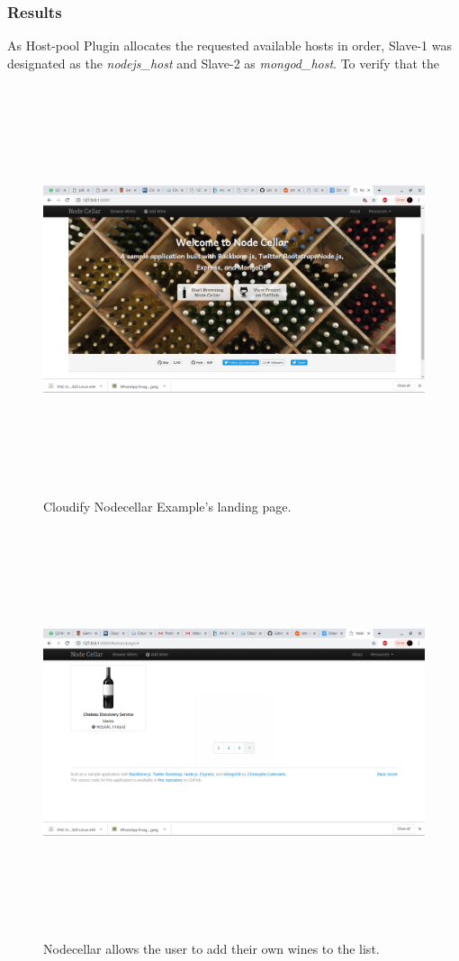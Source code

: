 \subsubsection*{Results}

As Host-pool Plugin allocates the requested available hosts in order, Slave-1 was designated as the \textit{nodejs\_host} and Slave-2 as \textit{mongod\_host}. To verify that the 

 \begin{figure}[ht!]
\centering
  \includegraphics[width=12cm,height=12cm, keepaspectratio]{Nodecellarscreenshot.png}%
  \caption{Cloudify Nodecellar Example's landing page.}
  \label{fig:nodecellar}
\end{figure}

 \begin{figure}[ht!]
\centering
  \includegraphics[width=12cm,height=12cm, keepaspectratio]{chateaudiscoveryservice.png}%
  \caption{Nodecellar allows the user to add their own wines to the list.}
  \label{fig:chateau}
\end{figure}